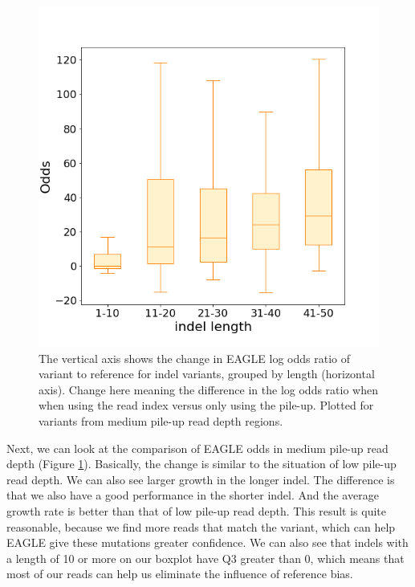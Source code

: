 \begin{figure}[H]
    \centering
    \includegraphics[width=0.6\columnwidth]{body/image/4-10.png}
    \captionsetup{labelfont=bf}
    \renewcommand{\baselinestretch}{1.0}
    \caption[medium pile-up read depth odds change ratio]{The vertical axis shows the change in EAGLE log odds ratio of variant to reference for indel variants, grouped by length (horizontal axis).  Change here meaning the difference in the log odds ratio when when using the read index versus only using the pile-up.  Plotted for variants from medium pile-up read depth regions.}
    \label{f4-10}
\end{figure}

Next, we can look at the comparison of EAGLE odds in medium pile-up read depth (Figure \ref{f4-10}). Basically, the change is similar to the situation of low pile-up read depth. We can also see larger growth in the longer indel. The difference is that we also have a good performance in the shorter indel. And the average growth rate is better than that of low pile-up read depth. This result is quite reasonable, because we find more reads that match the variant, which can help EAGLE give these mutations greater confidence.
We can also see that indels with a length of 10 or more on our boxplot have Q3 greater than 0, which means that most of our reads can help us eliminate the influence of reference bias.


